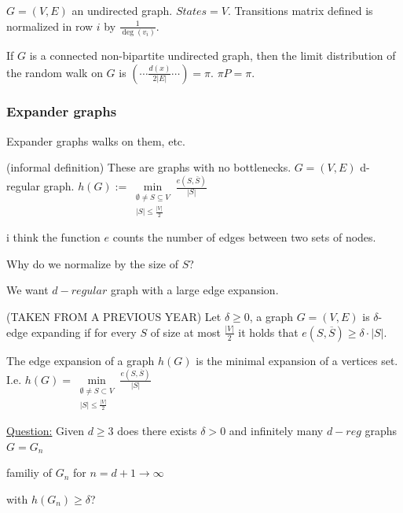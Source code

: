 $G=\left(V,E\right)$ an undirected graph. $States=V$. Transitions
matrix defined is normalized in row $i$ by $\frac{1}{\deg\left(v_{i}\right)}$.
\begin{proposition}
If $G$ is a connected non-bipartite undirected graph, then the limit
distribution of the random walk on $G$ is $\left(\cdots\frac{d\left(x\right)}{2\left|E\right|}\cdots\right)=\pi$.
$\pi P\overset{}{=}\pi$.
\end{proposition}


\subsubsection{Expander graphs}

Expander graphs walks on them, etc.

(informal definition) These are graphs with no bottlenecks. $G=\left(V,E\right)$
d-regular graph. $h\left(G\right):=\min\limits _{\begin{array}{c}
\emptyset\ne S\subseteq V\\
\left|S\right|\le\frac{\left|V\right|}{2}
\end{array}}\frac{e\left(S,\bar{S}\right)}{\left|S\right|}$ %
\begin{insight}
i think the function $e$ counts the number of edges between two sets
of nodes.

Why do we normalize by the size of $S$?%
\end{insight}

We want $d-regular$ graph with a large edge expansion.
\begin{definition}
(TAKEN FROM A PREVIOUS YEAR) Let $\delta\ge0$, a graph $G=\left(V,E\right)$
is $\delta$-edge expanding if for every $S$ of size at most $\frac{\left|V\right|}{2}$
it holds that $e\left(S,\overline{S}\right)\ge\delta\cdot\left|S\right|$.
\end{definition}

\begin{definition}
The edge expansion of a graph $h\left(G\right)$ is the minimal expansion
of a vertices set. I.e. $h\left(G\right)=\min\limits _{\begin{array}{c}
\emptyset\ne S\subset V\\
\left|S\right|\le\frac{\left|V\right|}{2}
\end{array}}\frac{e\left(S,\overline{S}\right)}{\left|S\right|}$
\end{definition}

\uline{Question:} Given $d\ge3$ does there exists $\delta>0$
and infinitely many $d-reg$ graphs $G=G_{n}$ %
\begin{insight}
familiy of $G_{n}$ for $n=d+1\to\infty$%
\end{insight}
with $h\left(G_{n}\right)\ge\delta$?

